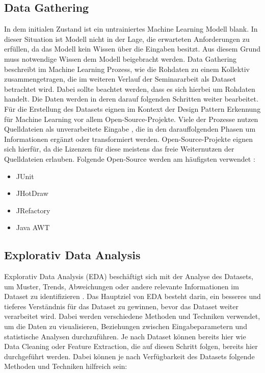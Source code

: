 \documentclass[conference]{IEEEtran}
\begin{document}
\subsection{Data Gathering}
In dem initialen Zustand ist ein untrainiertes Machine Learning Modell blank. In dieser Situation ist Modell nicht in der Lage, die erwarteten Anforderungen zu erfüllen, da das Modell kein Wissen über die Eingaben besitzt. Aus diesem Grund muss notwendige Wissen dem Modell beigebracht werden.
Data Gathering beschreibt im Machine Learning Prozess, wie die Rohdaten zu einem Kollektiv zusammengetragen, die im weiteren Verlauf der Seminararbeit als Dataset betrachtet wird. Dabei sollte beachtet werden, dass es sich hierbei um Rohdaten handelt. Die Daten werden in deren darauf folgenden Schritten weiter bearbeitet.
Für die Erstellung des Datasets eignen im Kontext der Design Pattern Erkennung für Machine Learning vor allem Open-Source-Projekte. Viele der Prozesse nutzen Quelldateien als unverarbeitete Eingabe \cite[p. 5801]{Yarahmadi2020}, die in den darauffolgenden Phasen um Informationen ergänzt oder transformiert werden. Open-Source-Projekte eignen sich hierfür, da die Lizenzen für diese meistens das freie Weiternutzen der Quelldateien erlauben.
Folgende Open-Source werden am häufigsten verwendet \cite[p. 5817]{Yarahmadi2020}:

\begin{itemize}
    \item JUnit
    \item JHotDraw
    \item JRefactory
    \item Java AWT
\end{itemize}

\subsection{Explorativ Data Analysis}

Explorativ Data Analysis (EDA) beschäftigt sich mit der Analyse des Datasets, um Muster, Trends, Abweichungen oder andere relevante Informationen im Dataset zu identifizieren \cite{IBM}.
Das Hauptziel von EDA besteht darin, ein besseres und tieferes Verständnis für das Dataset zu gewinnen, bevor das Dataset weiter verarbeitet wird. Dabei werden verschiedene Methoden und Techniken verwendet,
um die Daten zu visualisieren, Beziehungen zwischen Eingabeparametern und statistische Analysen durchzuführen. Je nach Dataset können bereits hier wie Data Cleaning oder Feature Extraction, die auf diesen Schritt folgen, bereits hier durchgeführt werden.
Dabei können je nach Verfügbarkeit des Datasets folgende Methoden und Techniken hilfreich sein:
\end{document}
